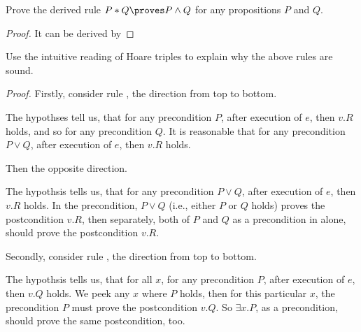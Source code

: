 \begin{exercise}
 Prove the derived rule $P * Q \proves P \wedge Q$ for any propositions $P$ and $Q$.
\end{exercise}

\begin{proof}
  It can be derived by
\end{proof}

\begin{exercise}
  Use the intuitive reading of Hoare triples to explain why the above rules are 
  sound.
\end{exercise}

  \hspace*{-2em} \textit{Proof.}
  Firstly, consider rule , the direction from top to 
  bottom.

  The hypothses tell us, that for any precondition $P$, after execution of $e$,
  then $v.R$ holds, and so for any precondition $Q$.
  It is reasonable that for any precondition $P \vee Q$, after execution of
  $e$, then $v.R$ holds.

  Then the opposite direction.

  The hypothsis tells us, that for any precondition $P \vee Q$, after execution
  of $e$, then $v.R$ holds.
  In the precondition, $P \vee Q$ (i.e., either $P$ or $Q$ holds) proves
  the postcondition $v.R$, then separately, both of $P$ and $Q$ as a precondition
  in alone, should prove the postcondition $v.R$.
  
  Secondly, consider rule , the direction from top to 
  bottom.

  The hypothsis tells us, that for all $x$, for any precondition $P$, after
  execution of $e$, then $v.Q$ holds.
  We peek any $x$ where $P$ holds, then for this particular $x$, the precondition
  $P$ must prove the postcondition $v.Q$. So $\exists x. P$, as a precondition,
  should prove the same postcondition, too.

